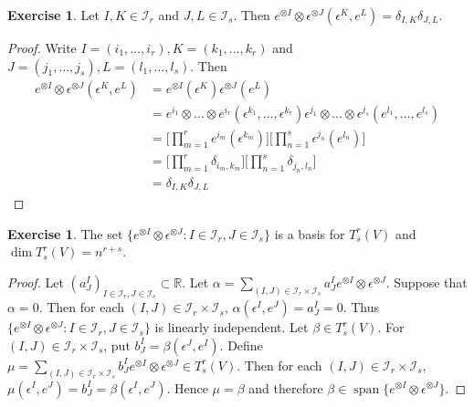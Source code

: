 \documentclass{book}
\theoremstyle{definition}
\newtheorem{ex}[definition]{Exercise}
\newcommand{\al}{\alpha}
\newcommand{\be}{\beta}
\newcommand{\del}{\delta}
\newcommand{\ep}{\epsilon}
\newcommand{\R}{\mathbb{R}}
\newcommand{\MI}{\mathcal{I}}
\DeclareMathOperator{\spn}{span}
\DeclareMathOperator*{\0}{\mbf{0}}
\DeclareMathOperator*{\1}{\mbf{1}}
\begin{document}
	\begin{ex}
	Let $I, K \in \MI_r$  and $J, L \in \MI_s$. Then $e^{\otimes I} \otimes \ep^{\otimes J}(\ep^K, e^L) = \del_{I,K} \del_{J,L}$. 
	\end{ex}	
	
	\begin{proof}
	Write $I = (i_1, \dots, i_r), K=(k_1, \dots, k_r)$ and $J = (j_1, \dots, j_s), L = (l_1, \dots, l_s)$. Then 
	\begin{align*}
	e^{\otimes I} \otimes \ep^{\otimes J}(\ep^K, e^L) 
	&= e^{\otimes I}(\ep^K)\ep^{\otimes J}(e^L) \\
	&= e^{i_1}\otimes \dots \otimes e^{i_r}(\ep^{k_1}, \dots, \ep^{k_r}) \ep^{j_1}\otimes \dots \otimes \ep^{j_s}(e^{l_1}, \dots, e^{l_s}) \\
	&=\bigg[\prod_{m=1}^r e^{i_m}(\ep^{k_m}) \bigg] \bigg[ \prod_{n=1}^s  \ep^{j_n}(e^{l_n}) \bigg] \\
	&= \bigg[\prod_{m=1}^r \del_{i_m, k_m} \bigg] \bigg[ \prod_{n=1}^s  \del_{j_n, l_n} \bigg] \\
	&= \del_{I,K}\del_{J,L}
	\end{align*}
\end{proof}		
		
	\begin{ex}
		The set $\{e^{\otimes I} \otimes \ep^{\otimes J}: I \in \MI_r, J \in \MI_s\}$ is a basis for $T^r_s(V)$ and $\dim T^r_s(V) = {n^{r+s}}$.
	\end{ex}

	\begin{proof}
		Let $(a^I_J)_{I \in \MI_r, J \in \MI_s} \subset \R$. Let $\al = \sum\limits_{(I,J) \in \MI_r \times \MI_s} a^I_J e^{\otimes I} \otimes  \ep^{\otimes J}$. 
		Suppose that $\al = 0$. Then for each $(I,J) \in \MI_r \times \MI_s$, $\al(\ep^I, e^J) = a^I_J = 0$. Thus $\{e^{\otimes I} \otimes \ep^{\otimes J}: I \in \MI_r, J \in \MI_s\}$ is linearly independent. Let $\be \in T^r_s(V)$. For $(I,J) \in \MI_r \times \MI_s$, put $b^I_J = \be(\ep^J, e^I)$. Define $\mu = \sum\limits_{(I,J) \in \MI_r \times \MI_s} b^I_J e^{\otimes I} \otimes \ep^{\otimes J} \in T^r_s(V)$. Then for each $(I,J) \in \MI_r \times \MI_s$, $\mu(\ep^I, e^J) = b^I_J = \be(\ep^I, e^J)$. Hence $\mu = \be$ and therefore $\be \in \spn \{e^{\otimes I} \otimes \ep^{\otimes J} \}$.
	\end{proof}		
		
		
		
		
	
	
	
	
	
\end{document}
